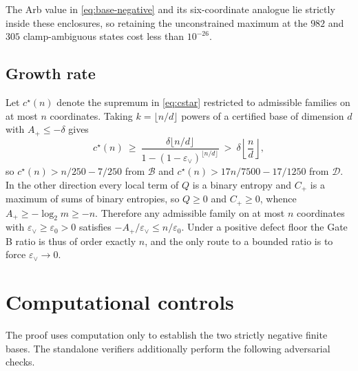 \documentclass[11pt]{article}
\theoremstyle{remark}
\newcommand{\B}{\mathcal B}
\newcommand{\eps}{\varepsilon}
\begin{document}
The Arb value in \eqref{eq:base-negative} and its six-coordinate
analogue lie strictly inside these enclosures, so retaining the unconstrained
maximum at the $982$ and $305$ clamp-ambiguous states cost less than
$10^{-26}$.

\subsection{Growth rate}

Let $c^\star(n)$ denote the supremum in \eqref{eq:cstar} restricted to
admissible families on at most $n$ coordinates.  Taking
$k=\lfloor n/d\rfloor$ powers of a certified base of dimension $d$ with
$A_+\le-\delta$ gives
\[
 c^\star(n)\ \ge\
 \frac{\delta\lfloor n/d\rfloor}{1-(1-\eps_\vee)^{\lfloor n/d\rfloor}}
 \ >\ \delta\left\lfloor\frac nd\right\rfloor,
\]
so $c^\star(n)>n/250-7/250$ from $\B$ and $c^\star(n)>17n/7500-17/1250$ from
$\mathcal D$.  In the other direction every local term of $Q$ is a binary
entropy and $C_+$ is a maximum of sums of binary entropies, so $Q\ge0$ and
$C_+\ge0$, whence $A_+\ge-\log_2m\ge-n$.  Therefore any admissible family on at
most $n$ coordinates with $\eps_\vee\ge\eps_0>0$ satisfies
$-A_+/\eps_\vee\le n/\eps_0$.  Under a positive defect floor the Gate B ratio is
thus of order exactly $n$, and the only route to a bounded ratio is to force
$\eps_\vee\to0$.

\section{Computational controls}

The proof uses computation only to establish the two strictly negative finite
bases.  The standalone verifiers additionally perform the following
adversarial checks.
\end{document}

